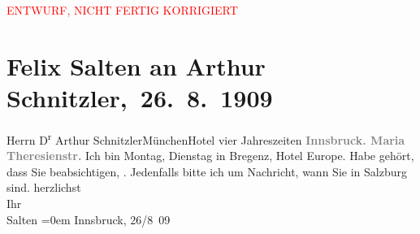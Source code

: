 
\begin{center}
            \textcolor{red}{ENTWURF, NICHT FERTIG KORRIGIERT}
                      \end{center}
            
         \renewcommand{\erwaehnteOrte}{Orte: Bregenz, Hotel Vier Jahreszeiten, Hotel de l’Europe, Innsbruck, Maria-Theresien-Straße, München, Salzburg}
         \renewcommand{\erwaehnteWerke}{}
               \section[ Felix Salten an Arthur Schnitzler, 26. 8. 1909]{ Felix Salten an Arthur Schnitzler, 26. 8. 1909}\nopagebreak{}\rehead{ }\begin{ledgroupsized}[t]{13cm}\normalsize\beginnumbering \toendnotes[C]{\smallbreak\pagebreak[2]} 
\toendnotes[C]{\smallbreak}\pstart{}{\pb}Herrn D\textsuperscript{r} Arthur Schnitzler\pend{}\pstart{}München\pend{}\pstart{}Hotel vier Jahreszeiten\pend{}{\bigskip}\pstart
           \noindent{}\centering{}{\pb}\textcolor{gray}{\textbf{Innsbruck. Maria Theresienstr.}}\pend
           \pstart
           {\pb}Ich bin Montag, Dienstag in Bregenz, Hotel Europe.
               Habe gehört, dass Sie beabsichtigen, \label{K_L03507-1v}\label{K_L03507-1h}. Jedenfalls bitte ich um Nachricht, wann Sie in Salzburg sind.\pend
           \pstart
           herzlichst {\\[\baselineskip]}Ihr {\\[\baselineskip]}\spacefill\mbox{Salten}\pend
           \leftskip=0em{}\pstart
           Innsbruck, 26/8 09\pend
           
         
         \endnumbering{}\end{ledgroupsized}  \newcommand{\dateiname}{L03507}\newcommand{\titel}{Felix Salten an Arthur Schnitzler, 26. 8. 1909}\newcommand{\editorInnen}{Martin Anton Müller und Laura Untner}
      